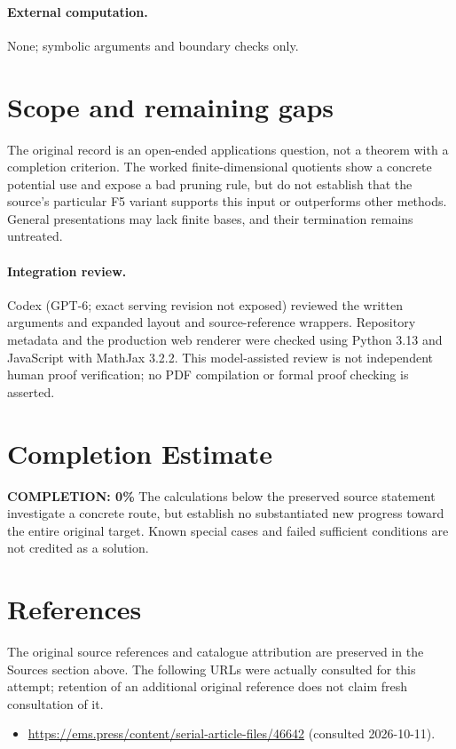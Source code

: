 \documentclass[11pt]{article}
\begin{document}
\paragraph{External computation.} None; symbolic arguments and boundary checks only.
\section{Scope and remaining gaps}
The original record is an open-ended applications question, not a theorem with a completion criterion. The worked finite-dimensional quotients show a concrete potential use and expose a bad pruning rule, but do not establish that the source's particular F5 variant supports this input or outperforms other methods. General presentations may lack finite bases, and their termination remains untreated.
\paragraph{Integration review.} Codex (GPT-6; exact serving revision not exposed) reviewed the written arguments and expanded layout and source-reference wrappers. Repository metadata and the production web renderer were checked using Python 3.13 and JavaScript with MathJax 3.2.2. This model-assisted review is not independent human proof verification; no PDF compilation or formal proof checking is asserted.

\section{Completion Estimate}
\noindent\textbf{COMPLETION: 0\%}
The calculations below the preserved source statement investigate a concrete route,
but establish no substantiated new progress toward the entire original target.
Known special cases and failed sufficient conditions are not credited as a solution.
\section{References}
The original source references and catalogue attribution are preserved in the
Sources section above. The following URLs were actually consulted for this attempt;
retention of an additional original reference does not claim fresh consultation of it.
\begin{itemize}
\item \url{https://ems.press/content/serial-article-files/46642} (consulted 2026-10-11). 
\end{itemize}
\end{document}
